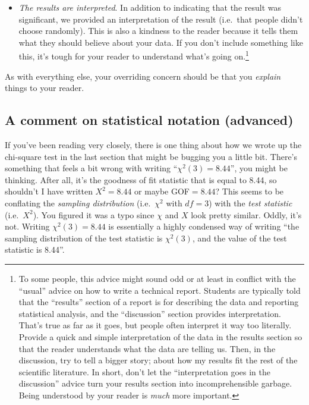 \documentclass[
  11pt,
  a4paper,
  twoside,symmetric,openright]{book}
\theoremstyle{break}
\theoremstyle{break}
\begin{document}
\begin{itemize}
\item
  \emph{The results are interpreted}. In addition to indicating that the result was significant, we provided an interpretation of the result (i.e.~that people didn't choose randomly). This is also a kindness to the reader because it tells them what they should believe about your data. If you don't include something like this, it's tough for your reader to understand what's going on.\footnote{To some people, this advice might sound odd or at least in conflict with the ``usual'' advice on how to write a technical report. Students are typically told that the ``results'' section of a report is for describing the data and reporting statistical analysis, and the ``discussion'' section provides interpretation. That's true as far as it goes, but people often interpret it way too literally. Provide a quick and simple interpretation of the data in the results section so that the reader understands what the data are telling us. Then, in the discussion, try to tell a bigger story; about how my results fit the rest of the scientific literature. In short, don't let the ``interpretation goes in the discussion'' advice turn your results section into incomprehensible garbage. Being understood by your reader is \emph{much} more important.}
\end{itemize}

As with everything else, your overriding concern should be that you \emph{explain} things to your reader.

\subsection{A comment on statistical notation (advanced)}\label{a-comment-on-statistical-notation-advanced}

If you've been reading very closely, there is one thing about how we wrote up the chi-square test in the last section that might be bugging you a little bit. There's something that feels a bit wrong with writing ``\(\chi^2(3) = 8.44\)'', you might be thinking. After all, it's the goodness of fit statistic that is equal to 8.44, so shouldn't I have written \(X^2 = 8.44\) or maybe GOF\(=8.44\)? This seems to be conflating the \emph{sampling distribution} (i.e.~\(\chi^2\) with \(df = 3\)) with the \emph{test statistic} (i.e.~\(X^2\)). You figured it was a typo since \(\chi\) and \(X\) look pretty similar. Oddly, it's not. Writing \(\chi^2(3) = 8.44\) is essentially a highly condensed way of writing ``the sampling distribution of the test statistic is \(\chi^2(3)\), and the value of the test statistic is 8.44''.
\end{document}
